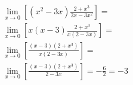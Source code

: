 \begin{ex}
\begin{align}
&\lim_{x\rightarrow 0} \left[(x^2-3x)\frac{2+x^3}{2x-3x^2}\right]=\nonumber\\
&\lim_{x\rightarrow 0} \left[ x(x-3)\frac{2+x^3}{x(2-3x)}\right]=\nonumber\\
&\lim_{x\rightarrow 0} \left[\frac{(x-3)(2+x^3)}{x(2-3x)}\right]=\nonumber\\
&\lim_{x\rightarrow 0} \left[\frac{(x-3)(2+x^3)}{2-3x}\right]=-\frac{6}{2}=-3\nonumber
\end{align}
\end{ex}
